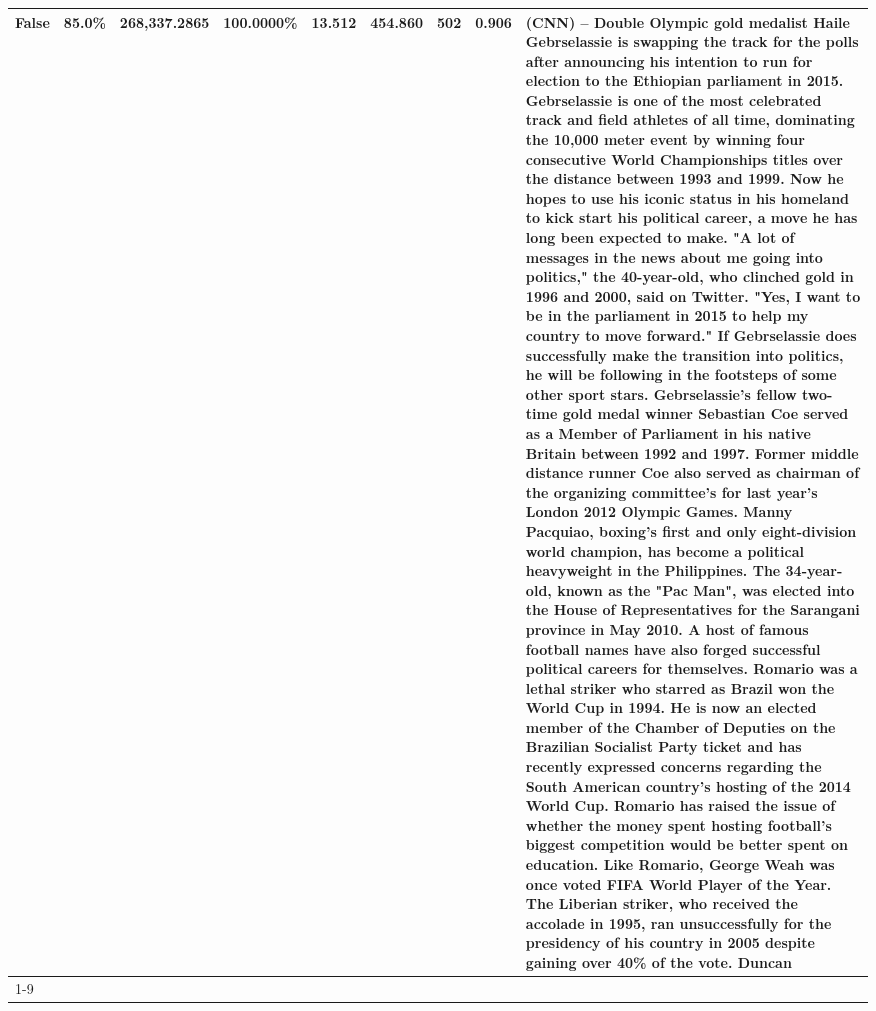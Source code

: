 \begin{table}[H]
{\begin{tabular}{lllrlllll}
False & 85.0\% & 268,337.2865 & \bfseries \color{red} 100.0000\% & 13.512 & 454.860 & 502 & 0.906 & (CNN) -- Double Olympic gold medalist Haile Gebrselassie is swapping the track for the polls after announcing his intention to run for election to the Ethiopian parliament in 2015. Gebrselassie is one of the most celebrated track and field athletes of all time, dominating the 10,000 meter event by winning four consecutive World Championships titles over the distance between 1993 and 1999. Now he hopes to use his iconic status in his homeland to kick start his political career, a move he has long been expected to make. "A lot of messages in the news about me going into politics," the 40-year-old, who clinched gold in 1996 and 2000, said on Twitter. "Yes, I want to be in the parliament in 2015 to help my country to move forward." If Gebrselassie does successfully make the transition into politics, he will be following in the footsteps of some other sport stars. Gebrselassie's fellow two-time gold medal winner Sebastian Coe served as a Member of Parliament in his native Britain between 1992 and 1997. Former middle distance runner Coe also served as chairman of the organizing committee's for last year's London 2012 Olympic Games. Manny Pacquiao, boxing's first and only eight-division world champion, has become a political heavyweight in the Philippines. The 34-year-old, known as the "Pac Man", was elected into the House of Representatives for the Sarangani province in May 2010. A host of famous football names have also forged successful political careers for themselves. Romario was a lethal striker who starred as Brazil won the World Cup in 1994. He is now an elected member of the Chamber of Deputies on the Brazilian Socialist Party ticket and has recently expressed concerns regarding the South American country's hosting of the 2014 World Cup. Romario has raised the issue of whether the money spent hosting football's biggest competition would be better spent on education. Like Romario, George Weah was once voted FIFA World Player of the Year. The Liberian striker, who received the accolade in 1995, ran unsuccessfully for the presidency of his country in 2005 despite gaining over 40\% of the vote. Duncan \\
\cline{1-9}

\end{tabular}}
\end{table}
